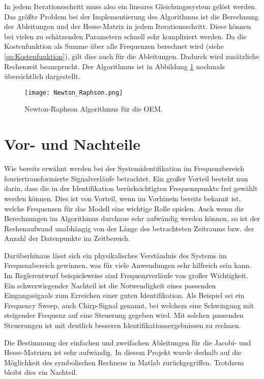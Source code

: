 In jedem Iterationsschritt muss also ein lineares Gleichungssystem gelöst werden. Das größte Problem bei der Implementierung 
des Algorithmus ist die Berechnung der Ableitungen und der Hesse-Matrix in jedem Iterationsschritt. Diese können bei vielen 
zu schätzenden Parametern schnell sehr kompliziert werden. Da die Kostenfunktion als Summe über alle Frequenzen berechnet 
wird (siehe \cref{eq:Kostenfunktion}), gilt dies auch für die Ableitungen. Dadurch wird zusätzliche Rechenzeit 
beansprucht. Der Algorithmus ist in Abbildung \ref{fig:Newton_Raphson} nochmals übersichtlich dargestellt.  

\begin{figure}[h!]
	\centering
	\texttt{[image: Newton\_Raphson.png]}
	\caption{Newton-Raphson Algorithmus für die OEM.}
	\label{fig:Newton_Raphson}
\end{figure}

\section{Vor- und Nachteile}
Wie bereits erwähnt werden bei der Systemidentifikation im Frequenzbereich fouriertransformierte Signalverläufe betrachtet. 
Ein großer Vorteil besteht nun darin, dass die in der Identifikation berücksichtigten Frequenzpunkte frei gewählt werden 
können. Dies ist von Vorteil, wenn im Vorhinein bereits bekannt ist, welche Frequenzen für das Modell eine wichtige Rolle 
spielen. Auch wenn die Berechnungen im Algorithmus durchaus sehr aufwändig werden können, so ist der Rechenaufwand unabhängig 
von der Länge des betrachteten Zeitraums bzw. der Anzahl der Datenpunkte im Zeitbereich.

Darüberhinaus lässt sich ein physikalisches Verständnis des Systems im Frequenzbereich gewinnen, was für viele Anwendungen 
sehr hilfreich sein kann. Im Reglerentwurf beispielsweise sind Frequenzverläufe von großer Wichtigkeit.\\

Ein schwerwiegender Nachteil ist die Notwendigkeit eines passenden Eingangssignals zum Erreichen einer guten Identifikation. 
Als Beispiel sei ein Frequency Sweep, auch Chirp-Signal genannt, bei welchem eine Schwingung mit steigender Frequenz auf eine 
Steuerung gegeben wird. Mit solchen passenden Steuerungen ist mit deutlich besseren Identifikationsergebnissen zu rechnen.

Die Bestimmung der einfachen und zweifachen Ableitungen für die Jacobi- und Hesse-Matrizen ist sehr aufwändig. In diesem 
Projekt wurde deshalb auf die Möglichkeit des symbolischen Rechnens in Matlab zurückgegriffen. Trotdzem bleibt dies ein 
Nachteil.

